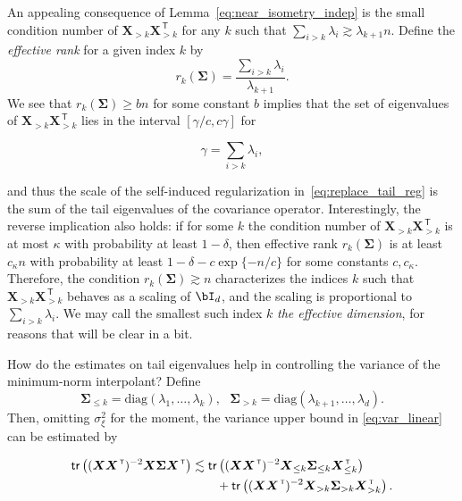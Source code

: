 An appealing consequence of Lemma~\ref{eq:near_isometry_indep}
is the small condition number of ${\boldsymbol X}_{> k}{\boldsymbol X}_{> k}^\ensuremath{{\scriptscriptstyle\mathsf{\,T}}}$ for any $k$ such that $\sum_{i>k}\lambda_i \gtrsim \lambda_{k+1}n$. Define the \emph{effective rank} for a given index $k$ by $$r_k({\boldsymbol \Sigma})
= \frac{\sum_{i>k} \lambda_i}{\lambda_{k+1}}.$$ We see that
$r_k({\boldsymbol \Sigma}) \ge b n$ for some constant $b$ implies that the set of eigenvalues of ${\boldsymbol X}_{> k}{\boldsymbol X}_{> k}^\ensuremath{{\scriptscriptstyle\mathsf{\,T}}}$ lies in the interval
$[\gamma/c,c\gamma]$ for

\begin{equation*}
    \gamma = \sum_{i>k} \lambda_i,
  \end{equation*}

and thus the scale of the self-induced regularization
in~\eqref{eq:replace_tail_reg} is the sum of the tail eigenvalues of the covariance operator. Interestingly, the reverse implication also holds: if for some $k$ the condition number of ${\boldsymbol X}_{> k}{\boldsymbol X}_{> k}^\ensuremath{{\scriptscriptstyle\mathsf{\,T}}}$ is at most $\kappa$ with probability at least $1-\delta$, then effective rank $r_k({\boldsymbol \Sigma})$ is at least $c_\kappa n$ with probability at least
$1-\delta-c\exp\{-n/c\}$ for some constants $c,c_\kappa$. Therefore, the condition $r_k({\boldsymbol \Sigma})\gtrsim n$ characterizes the indices $k$ such that ${\boldsymbol X}_{> k}{\boldsymbol X}_{> k}^\ensuremath{{\scriptscriptstyle\mathsf{\,T}}}$ behaves as a scaling of $\bI_d$,
and the scaling is proportional to $\sum_{i>k}\lambda_i$. We may call the smallest such index $k$ \emph{the effective dimension}, for reasons that will be clear in a bit.

How do the estimates on tail eigenvalues help in controlling the variance of the minimum-norm interpolant? Define
$${\boldsymbol \Sigma}_{\leq k}=\text{diag}(\lambda_1,\ldots, \lambda_k),~~~ {\boldsymbol \Sigma}_{> k}=\text{diag}(\lambda_{k+1},\ldots, \lambda_d).$$
Then, omitting $\sigma_\xi^2$ for the moment, the variance upper bound in \eqref{eq:var_linear} can be estimated by

\begin{align}
	\mathsf{tr}\left(({\boldsymbol X}{\boldsymbol X}^\ensuremath{{\scriptscriptstyle\mathsf{\,T}}})^{-2} {\boldsymbol X} {\boldsymbol \Sigma} {\boldsymbol X}^\ensuremath{{\scriptscriptstyle\mathsf{\,T}}} \right) 
		&\lesssim \mathsf{tr}\left(({\boldsymbol X}{\boldsymbol X}^\ensuremath{{\scriptscriptstyle\mathsf{\,T}}})^{-2} {\boldsymbol X}_{\leq k}
        {\boldsymbol \Sigma}_{\leq k} {\boldsymbol X}^\ensuremath{{\scriptscriptstyle\mathsf{\,T}}}_{\leq k} \right) \notag\\
		&\qquad {} + \mathsf{tr}\left(({\boldsymbol X}{\boldsymbol X}^\ensuremath{{\scriptscriptstyle\mathsf{\,T}}})^{-2} {\boldsymbol X}_{> k} {\boldsymbol \Sigma}_{> k} {\boldsymbol X}^\ensuremath{{\scriptscriptstyle\mathsf{\,T}}}_{> k} \right). \label{eq:lin_var_decomp2}
\end{align}

